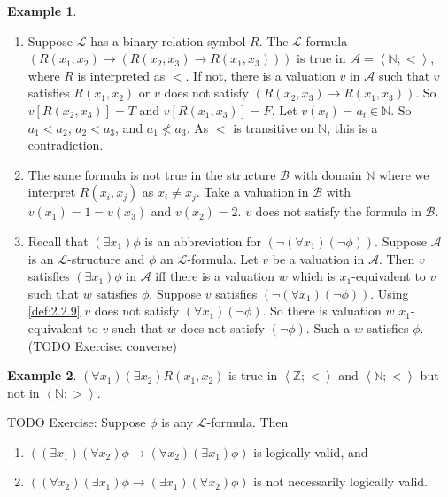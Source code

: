 \documentclass{article}
\newcommand{\N}{\mathbb{N}}
\newcommand{\Z}{\mathbb{Z}}
\newcommand{\A}{\mathcal{A}}
\renewcommand{\L}{\mathcal{L}}
\newcommand{\rb}[1]{\left( #1 \right)}
\renewcommand{\sb}[1]{\left[ #1 \right]}
\newcommand{\ab}[1]{\left\langle #1 \right\rangle}
\newcommand{\notb}[1]{\rb{\neg #1}}
\newcommand{\impb}[2]{\rb{#1 \rightarrow #2}}
\newcommand{\fab}[1]{\rb{\forall #1}}
\newcommand{\teb}[1]{\rb{\exists #1}}
\theoremstyle{definition}\newtheorem{definition}{Definition}[subsection]
\theoremstyle{definition}\newtheorem{remark}[definition]{Remark}
\theoremstyle{definition}\newtheorem*{example}{Example}
\theoremstyle{definition}\newtheorem*{note}{Note}
\begin{document}
\begin{example}
\hfill
\begin{enumerate}
\item Suppose $ \L $ has a binary relation symbol $ R $. The $ \L $-formula $ \impb{R\rb{x_1, x_2}}{\impb{R\rb{x_2, x_3}}{R\rb{x_1, x_3}}} $ is true in $ \A = \ab{\N; <} $, where $ R $ is interpreted as $ < $. If not, there is a valuation $ v $ in $ \A $ such that $ v $ satisfies $ R\rb{x_1, x_2} $ or $ v $ does not satisfy $ \impb{R\rb{x_2, x_3}}{R\rb{x_1, x_3}} $. So $ v\sb{R\rb{x_2, x_3}} = T $ and $ v\sb{R\rb{x_1, x_3}} = F $. Let $ v\rb{x_i} = a_i \in \N $. So $ a_1 < a_2 $, $ a_2 < a_3 $, and $ a_1 \not< a_3 $. As $ < $ is transitive on $ \N $, this is a contradiction.
\item The same formula is not true in the structure $ \mathcal{B} $ with domain $ \N $ where we interpret $ R\rb{x_i, x_j} $ as $ x_i \ne x_j $. Take a valuation in $ \mathcal{B} $ with $ v\rb{x_1} = 1 = v\rb{x_3} $ and $ v\rb{x_2} = 2 $. $ v $ does not satisfy the formula in $ \mathcal{B} $.
\item Recall that $ \teb{x_1}\phi $ is an abbreviation for $ \notb{\fab{x_1}\notb{\phi}} $. Suppose $ \A $ is an $ \L $-structure and $ \phi $ an $ \L $-formula. Let $ v $ be a valuation in $ \A $. Then $ v $ satisfies $ \teb{x_1}\phi $ in $ \A $ iff there is a valuation $ w $ which is $ x_1 $-equivalent to $ v $ such that $ w $ satisfies $ \phi $. Suppose $ v $ satisfies $ \notb{\fab{x_1}\notb{\phi}} $. Using \ref{def:2.2.9} $ v $ does not satisfy $ \fab{x_1}\notb{\phi} $. So there is valuation $ w $ $ x_1 $-equivalent to $ v $ such that $ w $ does not satisfy $ \notb{\phi} $. Such a $ w $ satisfies $ \phi $. (TODO Exercise: converse)
\end{enumerate}
\end{example}

\begin{example}
$ \fab{x_1}\teb{x_2}R\rb{x_1, x_2} $ is true in $ \ab{\Z; <} $ and $ \ab{\N; <} $ but not in $ \ab{\N; >} $.
\end{example}

TODO Exercise: Suppose $ \phi $ is any $ \L $-formula. Then
\begin{enumerate}
\item $ \impb{\teb{x_1}\fab{x_2}\phi}{\fab{x_2}\teb{x_1}\phi} $ is logically valid, and
\item $ \impb{\fab{x_2}\teb{x_1}\phi}{\teb{x_1}\fab{x_2}\phi} $ is not necessarily logically valid.
\end{enumerate}
\end{document}
